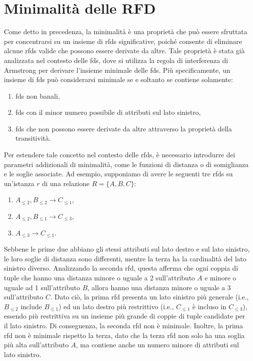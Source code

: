 \section{Minimalit\`{a} delle RFD}
Come detto in precedenza, la minimalit\`{a} \`{e} una propriet\`{a} che pu\`{o} essere sfruttata per concentrarsi su un insieme di \acrshort{rfds} significative, poich\'{e} consente di eliminare alcune \acrshort{rfds} valide che possono essere derivate da altre. Tale propriet\`{a} \`{e} stata gi\`{a} analizzata nel contesto delle \acrshort{fds}, dove si utilizza la regola di interferenza di Armstrong per derivare l'insieme minimale delle \acrshort{fds}. Pi\`{u} specificamente, un insieme di \acrshort{fds} pu\`{o} considerarsi minimale se e soltanto se contiene solamente:
\begin{enumerate}
    \item \acrshort{fds} non banali,
    \item \acrshort{fds} con il minor numero possibile di attributi sul lato sinistro,
    \item \acrshort{fds} che non possono essere derivate da altre attraverso la propriet\`{a} della transitivit\`{a}.
\end{enumerate}\par
Per estendere tale concetto nel contesto delle \acrshort{rfds}, \`{e} necessario introdurre dei parametri addizionali di minimalit\`{a}, come le funzioni di distanza o di somiglianza e le soglie associate. Ad esempio, supponiamo di avere le seguenti tre \acrshort{rfds} su un'istanza $r$ di una relazione $R=\{A,B,C\}$:
\begin{enumerate}
    \item $A_{\leq2},B_{\leq2}\rightarrow C_{\leq1}$,
    \item $A_{\leq2},B_{\leq1}\rightarrow C_{\leq3}$,
    \item $A_{\leq3}\rightarrow C_{\leq1}$.
\end{enumerate}
Sebbene le prime due abbiano gli stessi attributi sul lato destro e sul lato sinistro, le loro soglie di distanza sono differenti, mentre la terza ha la cardinalit\`{a} del lato sinistro diverso. Analizzando la seconda \acrshort{rfd}, questa afferma che ogni coppia di tuple che hanno una distanza minore o uguale a 2 sull'attributo $A$ e minore o uguale ad 1 sull'attributo $B$, allora hanno una distanza minore o uguale a 3 sull'attributo $C$. Dato ci\`{o}, la prima \acrshort{rfd} presenta un lato sinistro pi\`{u} generale (i.e., $B_{\leq2}$ include $B_{\leq1}$) ed un lato destro pi\`{u} restrittivo (i.e., $C_{\leq1}$ \`{e} incluso in $C_{\leq3}$), essendo pi\`{u} restrittiva su un insieme pi\`{u} grande di coppie di tuple candidate per il lato sinistro. Di conseguenza, la seconda \acrshort{rfd} non \`{e} minimale. Inoltre, la prima \acrshort{rfd} non \`{e} minimale rispetto la terza, dato che la terza \acrshort{rfd} non solo ha una soglia pi\`{u} alta sull'attributo $A$, ma contiene anche un numero minore di attributi sul lato sinistro.\par

